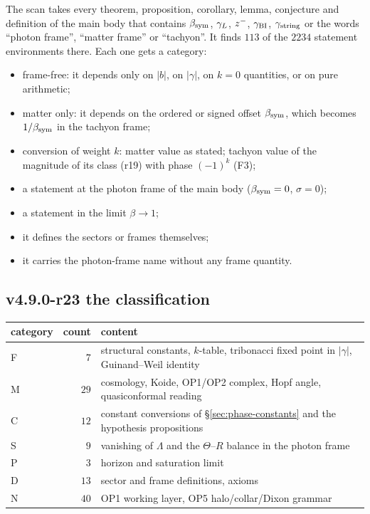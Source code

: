The scan takes every theorem, proposition, corollary, lemma, conjecture and definition of the main body that contains
\(\beta_{\mathrm{sym}}\), \(\gamma_L\), \(z^-\), \(\gamma_{\mathrm{BI}}\), \(\gamma_{\mathrm{string}}\) or the words ``photon frame'', ``matter frame'' or ``tachyon''.  It finds \(113\)
of the \(2234\) statement environments there.  Each one gets a category:
\begin{itemize}[leftmargin=2em]
\item[F] frame-free: it depends only on \(|b|\), on \(|\gamma|\), on \(k=0\) quantities, or on pure arithmetic;
\item[M] matter only: it depends on the ordered or signed offset \(\beta_{\mathrm{sym}}\), which becomes \(1/\beta_{\mathrm{sym}}\) in the tachyon frame;
\item[C] conversion of weight \(k\): matter value as stated; tachyon value of the magnitude of its class (r19) with phase \((-1)^k\) (F3);
\item[S] a statement at the photon frame of the main body (\(\beta_{\mathrm{sym}}=0\), \(\sigma=0\));
\item[P] a statement in the limit \(\beta\to1\);
\item[D] it defines the sectors or frames themselves;
\item[N] it carries the photon-frame name without any frame quantity.
\end{itemize}

\subsection*{v4.9.0-r23 the classification}
\label{subsec:v490-r23-classification}

\begin{center}
\small
\begin{tabular}{@{}lrl@{}}
\toprule
category & count & content\\
\midrule
F & \(7\) & structural constants, \(k\)-table, tribonacci fixed point in \(|\gamma|\), Guinand--Weil identity\\
M & \(29\) & cosmology, Koide, OP1/OP2 complex, Hopf angle, quasiconformal reading\\
C & \(12\) & constant conversions of \S\ref{sec:phase-constants} and the hypothesis propositions\\
S & \(9\) & vanishing of \(\Lambda\) and the \(\Theta\)--\(R\) balance in the photon frame\\
P & \(3\) & horizon and saturation limit\\
D & \(13\) & sector and frame definitions, axioms\\
N & \(40\) & OP1 working layer, OP5 halo/collar/Dixon grammar\\
\bottomrule
\end{tabular}
\end{center}

